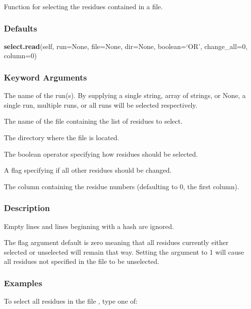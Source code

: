  Function for selecting the residues contained in a file. 
  

  
 \subsubsection{Defaults} 

 \textsf{\textbf{select.read}(self, run=None, file=None, dir=None, boolean=`OR', change\_all=0, column=0)} 

  
 \subsubsection{Keyword Arguments} 

   The name of the run(s).  By supplying a single string, array of strings, or None, a single run, multiple runs, or all runs will be selected respectively.   

   The name of the file containing the list of residues to select.   

   The directory where the file is located.   

   The boolean operator specifying how residues should be selected.   

   A flag specifying if all other residues should be changed.   

   The column containing the residue numbers (defaulting to 0, the first column).  

  

  
 \subsubsection{Description} 

 Empty lines and lines beginning with a hash are ignored. 
  

 The  flag argument default is zero meaning that all residues currently either selected or unselected will remain that way.  Setting the argument to 1 will cause all residues not specified in the file to be unselected. 
  

  
 \subsubsection{Examples} 

 To select all residues in the file , type one of: 
  


